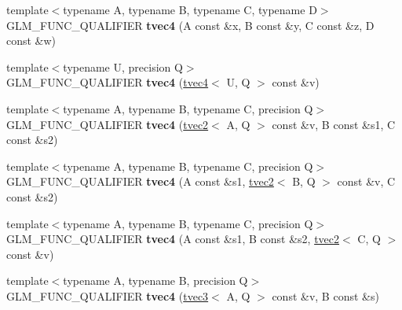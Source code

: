 \begin{DoxyCompactItemize}
\item 
{\footnotesize template$<$typename A, typename B, typename C, typename D$>$ }\\G\+L\+M\+\_\+\+F\+U\+N\+C\+\_\+\+Q\+U\+A\+L\+I\+F\+I\+ER {\bfseries tvec4} (A const \&x, B const \&y, C const \&z, D const \&w)\hypertarget{structglm_1_1detail_1_1tvec4_ad49650086418f165378a3cb3bd6dff22}{}\label{structglm_1_1detail_1_1tvec4_ad49650086418f165378a3cb3bd6dff22}

\item 
{\footnotesize template$<$typename U, precision Q$>$ }\\G\+L\+M\+\_\+\+F\+U\+N\+C\+\_\+\+Q\+U\+A\+L\+I\+F\+I\+ER {\bfseries tvec4} (\hyperlink{structglm_1_1detail_1_1tvec4}{tvec4}$<$ U, Q $>$ const \&v)\hypertarget{structglm_1_1detail_1_1tvec4_a6862f9f921f782523d5d9bfb099ce621}{}\label{structglm_1_1detail_1_1tvec4_a6862f9f921f782523d5d9bfb099ce621}

\item 
{\footnotesize template$<$typename A, typename B, typename C, precision Q$>$ }\\G\+L\+M\+\_\+\+F\+U\+N\+C\+\_\+\+Q\+U\+A\+L\+I\+F\+I\+ER {\bfseries tvec4} (\hyperlink{structglm_1_1detail_1_1tvec2}{tvec2}$<$ A, Q $>$ const \&v, B const \&s1, C const \&s2)\hypertarget{structglm_1_1detail_1_1tvec4_a88c6b7ecdef152cdf340eaf39b4e4606}{}\label{structglm_1_1detail_1_1tvec4_a88c6b7ecdef152cdf340eaf39b4e4606}

\item 
{\footnotesize template$<$typename A, typename B, typename C, precision Q$>$ }\\G\+L\+M\+\_\+\+F\+U\+N\+C\+\_\+\+Q\+U\+A\+L\+I\+F\+I\+ER {\bfseries tvec4} (A const \&s1, \hyperlink{structglm_1_1detail_1_1tvec2}{tvec2}$<$ B, Q $>$ const \&v, C const \&s2)\hypertarget{structglm_1_1detail_1_1tvec4_ad501d232fe0d59f7734803371445a9cd}{}\label{structglm_1_1detail_1_1tvec4_ad501d232fe0d59f7734803371445a9cd}

\item 
{\footnotesize template$<$typename A, typename B, typename C, precision Q$>$ }\\G\+L\+M\+\_\+\+F\+U\+N\+C\+\_\+\+Q\+U\+A\+L\+I\+F\+I\+ER {\bfseries tvec4} (A const \&s1, B const \&s2, \hyperlink{structglm_1_1detail_1_1tvec2}{tvec2}$<$ C, Q $>$ const \&v)\hypertarget{structglm_1_1detail_1_1tvec4_a5ba14812472c30b9d34fdafa413c1846}{}\label{structglm_1_1detail_1_1tvec4_a5ba14812472c30b9d34fdafa413c1846}

\item 
{\footnotesize template$<$typename A, typename B, precision Q$>$ }\\G\+L\+M\+\_\+\+F\+U\+N\+C\+\_\+\+Q\+U\+A\+L\+I\+F\+I\+ER {\bfseries tvec4} (\hyperlink{structglm_1_1detail_1_1tvec3}{tvec3}$<$ A, Q $>$ const \&v, B const \&s)\hypertarget{structglm_1_1detail_1_1tvec4_acdd7a9ea34155ac8f12b5959e599206b}{}\label{structglm_1_1detail_1_1tvec4_acdd7a9ea34155ac8f12b5959e599206b}


\end{DoxyCompactItemize}
